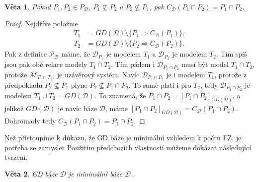\documentclass{article}
\newtheorem{theorem}{Věta}
\theoremstyle {definition}
\begin{document}
\begin{theorem}
  Pokud $P_1, P_2 \in P_{\mathcal{D}}$, $P_1 \not\subseteq P_2$ a $P_2
  \not\subseteq P_1$, pak $C_{\mathcal{D}} (P_1 \cap P_2) = P_1 \cap
  P_2$.
\end{theorem}

\begin{proof}
  Nejdříve položme 
  \begin {align*}
  T_1 &= GD(\mathcal D) \setminus \{P_1 \Rightarrow C_{\mathcal{D}}(P_1)\}, \\
  T_2 &= GD(\mathcal D) \setminus \{P_2 \Rightarrow C_{\mathcal{D}}(P_2)\}.
  \end {align*}
  Pak z definice $\mathcal P_{\mathcal D}$ máme, že
  $\mathcal{D}_{P_1}$ je modelem $T_1$ a $\mathcal{D}_{P_2}$ je
  modelem $T_2$. Tím spíš jsou pak obě relace modely $T_1\cap
  T_2$. Tím pádem i $\mathcal{D}_{P_1 \cap P_2}$ musí být model $T_1
  \cap T_2$, protože $\mathcal{M}_{T_1 \cap T_2}$, je uzávěrový
  systém. Navíc $\mathcal{D}_{P_1 \cap P_2}$ je i modelem $T_1$,
  protože z předpokladu $P_2 \not\subseteq P_1$ plyne $P_2
  \not\subseteq P_1\cap P_2$. To samé platí i pro $T_2$, tedy
  $\mathcal{D}_{P_1 \cap P_2}$ je modelem $T_1 \cup T_2 = GD(\mathcal
  D)$. To znamená, že $P_1 \cap P_2 = [P_1 \cap P_2]_{GD(\mathcal
    D)}$, a jelikož $GD(\mathcal D)$ je navíc báze $\mathcal D$, máme
  $[P_1 \cap P_2]_{GD(\mathcal D)} = C_{\mathcal D}(P_1 \cap
  P_2)$. Dohromady tedy $C_{\mathcal{D}}(P_1 \cap P_2) = P_1 \cap
  P_2$.
\end{proof}

Než přistoupíme k důkazu, že GD báze je minimální vzhledem k počtu FZ,
je potřeba se zamyslet Použitím předchozích vlastností můžeme dokázat
následující tvrzení.

\begin{theorem}
  GD báze $\mathcal{D}$ je minimální báze $\mathcal{D}$.
\end{theorem}
\end{document}
